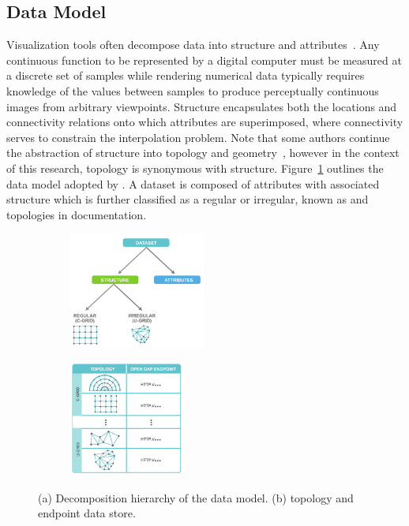 \subsection{Data Model}
Visualization tools often decompose data into structure and
attributes~\cite{vtk}. Any continuous function to be represented by a
digital computer must be measured at a discrete set of samples while
rendering numerical data typically requires knowledge of the values
between samples to produce perceptually continuous images from
arbitrary viewpoints. Structure encapsulates both the locations and
connectivity relations onto which attributes are superimposed, where
connectivity serves to constrain the interpolation problem. Note that
some authors continue the abstraction of structure into topology and
geometry~\cite{weiler}, however in the context of this research,
topology is synonymous with structure. Figure~\ref{fig:data_hierarchy}
outlines the data model adopted by \sciwms{}. A dataset is composed of
attributes with associated structure which is further classified as a
regular or irregular, known as \cgrid{} and \ugrid{} topologies in
\sciwms{} documentation.
\begin{figure}[ht!]
  \centering
  \begin{subfigure}[t]{0.45\textwidth}
    \centering
    \includegraphics[height=1.5in]{../figs/data_model_hierarchy}
    \caption{}
    \label{fig:data_hierarchy}
  \end{subfigure}
  \begin{subfigure}[t]{0.45\textwidth}
    \centering
    \includegraphics[height=1.5in]{../figs/sciwms_book_db_topology_endpoint_chart}
    \caption{}
    \label{fig:sciwms_topology_endpoints}
  \end{subfigure}
  \caption{(a) Decomposition hierarchy of the data model.  (b)
    \Sciwms{} topology and endpoint data store.}
\end{figure}
